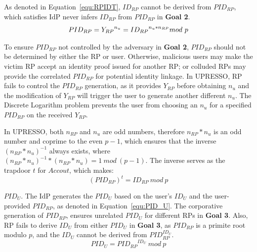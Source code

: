 As denoted in Equation~\ref{equ:RPIDT}, ${ID_{RP}}$ cannot be derived from $PID_{RP}$, which satisfies IdP never infers ${ID_{RP}}$ from $PID_{RP}$ in \textbf{Goal 2}.
   \begin{equation}
   PID_{RP} = {Y_{RP}}^{n_{u}} = {ID_{RP}}^{n_{u}* n_{RP}} mod \ p
   \label{equ:ID_{RP}T}
   \end{equation}

To ensure $PID_{RP}$ not controlled by the adversary in \textbf{Goal 2},
 $PID_{RP}$ should not be determined by  either the RP or user. %
Otherwise, malicious users may make the victim RP accept an identity proof issued for another RP; or colluded RPs may provide the correlated $PID_{RP}$ for potential identity linkage.
In UPRESSO, RP fails to control the $PID_{RP}$ generation, as it provides $Y_{RP}$ before obtaining $n_{u}$ and the modification of $Y_{RP}$ will trigger the user to generate another different  $n_{u}$. The Discrete Logarithm problem prevents the user from choosing an $n_{u}$ for a specified $PID_{RP}$ on the received $Y_{RP}$.

In UPRESSO, both $n_{RP}$ and $n_{u}$ are odd numbers, therefore $n_{RP}*n_{u}$ is an odd number and coprime to the even $p-1$, which ensures that the inverse $(n_{RP}*n_{u})^{-1}$ always exists, where  $(n_{RP}*n_{u})^{-1} * (n_{RP}*n_{u}) = 1 \ mod \ (p-1)$. The inverse  serves as  the trapdoor $t$ for $Accout$, which makes:
\begin{equation}
(PID_{RP})^t = ID_{RP} \ mod \ p
\label{equ:trapdoor}
\end{equation}


\noindent\textbf{$PID_U$}. The IdP generates the $PID_U$ based on the user's $ID_U$ and the user-provided $PID_{RP}$, as denoted in Equation~\ref{equ:PID_U}.
The corporative generation of $PID_{RP}$, ensures unrelated $PID_U$  for different RPs in \textbf{Goal 3}. Also, RP fails to derive $ID_U$ from either $PID_U$ in \textbf{Goal 3}, as
   $PID_{RP}$ is a primite root modulo $p$, and the $ID_U$ cannot be derived from $PID_{RP}^{ID_U}$.
\begin{equation}
 PID_U = {PID_{RP}}^{ID_U} \ mod \ p
 \label{equ:PID_U}
\end{equation}

